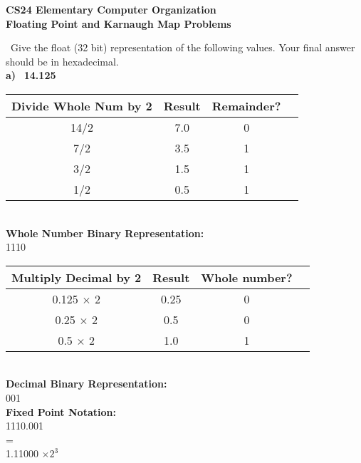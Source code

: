 \documentclass[12pt]{article}
\begin{document}
	\begin{center}
		\textbf{CS24 Elementary Computer Organization} \\
		\textbf{Floating Point and Karnaugh Map Problems} \vspace{0.5cm}
	\end{center}
	
	
	
	\noindent {} 
	 \ Give the float (32 bit) representation of the following values. Your final answer should be in hexadecimal. \vspace{1cm} \\
	 
	 \textbf{a)} \ \textbf{14.125}
	 
	 
	\begin{center}
		
		\begin{tabular}{ |c|c|c|c| } 
			\hline
			\textbf{Divide Whole Num by 2} & \textbf{Result} & \textbf{Remainder?}  \\
			\hline
			14/2 & 7.0 &  0 \\ 
			\hline
			7/2  & 3.5 &  1 \\ 
			\hline
			3/2  & 1.5 &  1 \\ 
			\hline
			1/2  & 0.5 &  1 \\
			\hline
		\end{tabular}  \vspace{0.4cm} \\
		
		
		\textbf{Whole Number Binary Representation:} \\
		1110 \vspace{1cm} \\
		
		\begin{tabular}{ |c|c|c|c| } 
			\hline
			\textbf{Multiply Decimal by 2} & \textbf{Result} & \textbf{Whole number?}  \\
			\hline
			0.125 $\times$ 2 & 0.25 &  0 \\ 
			\hline
			0.25  $\times$ 2 & 0.5  &  0 \\ 
			\hline
			0.5   $\times$ 2 & 1.0 &   1 \\ 
			\hline 
		\end{tabular}  \vspace{0.4cm} \\
	
		
		\textbf{Decimal Binary Representation:} \\
		001 \vspace{1cm} \\
		
		\textbf{Fixed Point Notation:} \\
		1110.001 \vspace{0.2cm} \\
		
		= \vspace{0.2cm}\\
		
		1.11000 $\times 2^3$ \vspace{2cm} \\
		
		
	\end{center}
	
\end{document}
